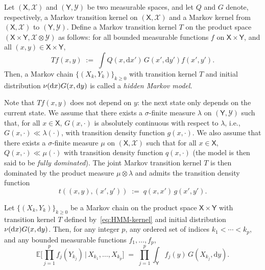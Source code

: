 \documentclass[english,graybox,envcountchap,envcountsame,sectrefs,shortlabels]{svmono}
\theoremstyle{style}
\newcommand{\eqsp}{}
\begin{document}
\begin{definition}\label{def:HMM}
Let $(\mathsf{X},\mathcal{X})$ and $(\mathsf{Y},\mathcal{Y})$ be two measurable
spaces, and let $Q$ and $G$ denote, respectively, a Markov transition kernel on
$(\mathsf{X},\mathcal{X})$ and a Markov kernel from $(\mathsf{X},\mathcal{X})$
to $(\mathsf{Y},\mathcal{Y})$. Define a Markov transition kernel $T$ on the
product space $(\mathsf{X}\times \mathsf{Y}, \mathcal{X}\otimes \mathcal{Y})$ as follows: for all bounded measurable functions $f$ on $\mathsf{X}\times \mathsf{Y}$, and all $(x,y) \in \mathsf{X}\times \mathsf{Y}$,
\begin{equation}\label{eq:HMM-kernel}
Tf(x,y) \;:=\; \int Q(x, \mathrm{d}x') \, G(x', \mathrm{d}y') f(x',y')\eqsp.
\end{equation}
Then, a Markov chain $\{(X_k,Y_k)\}_{k\ge 0}$ with transition kernel $T$ and initial distribution $\nu(\mathrm{d} x)G(x,\mathrm{d} y)$ is called a \emph{hidden Markov model}.
\end{definition}
Note that $Tf(x,y)$ does not depend on $y$: the next state only depends on the current state. We assume that there exists a $\sigma$-finite measure $\lambda$ on $(\mathsf{Y},\mathcal{Y})$ such
that, for all $x \in \mathsf{X}$, $G(x, \cdot)$ is absolutely continuous with
respect to $\lambda$, i.e., $G(x, \cdot) \ll \lambda(\cdot)$, with transition density function $g(x, \cdot)$. We also assume that there exists a $\sigma$-finite
measure $\mu$ on $(\mathsf{X},\mathcal{X})$ such that
for all $x \in \mathsf{X}$, $Q(x, \cdot) \ll \mu(\cdot)$ with transition
density function $q(x, \cdot)$ (the model is then said to be \emph{fully dominated}). The joint Markov
transition kernel $T$ is then dominated by the product measure $\mu \otimes \lambda$
and admits the transition density function
\[
t((x,y),(x',y')) \;:=\; q(x,x')\, g(x',y')\eqsp.
\]
\begin{proposition}\label{prop:conditional-independence-HMM}
Let $\{(X_k,Y_k)\}_{k\ge 0}$ be a Markov chain on the product space
$\mathsf{X}\times \mathsf{Y}$ with transition kernel $T$ defined by~\eqref{eq:HMM-kernel} and initial distribution $\nu(\mathrm{d} x)G(x,\mathrm{d} y)$. Then,
for any integer $p$, any ordered set of indices $k_1 < \cdots < k_p$, and any
bounded measurable functions $f_1,\dots,f_p$,
\begin{equation}\label{eq:HMM-cond-independence}
\mathbb{E}\Biggl[
\prod_{j=1}^{p} f_j(Y_{k_j}) \,\Big|\, X_{k_1}, \dots, X_{k_p}
\Biggr]
\;=\; \prod_{j=1}^{p} \int_{\mathsf{Y}} f_j(y) \, G(X_{k_j}, \mathrm{d}y)\eqsp.
\end{equation}
\end{proposition}
\end{document}

